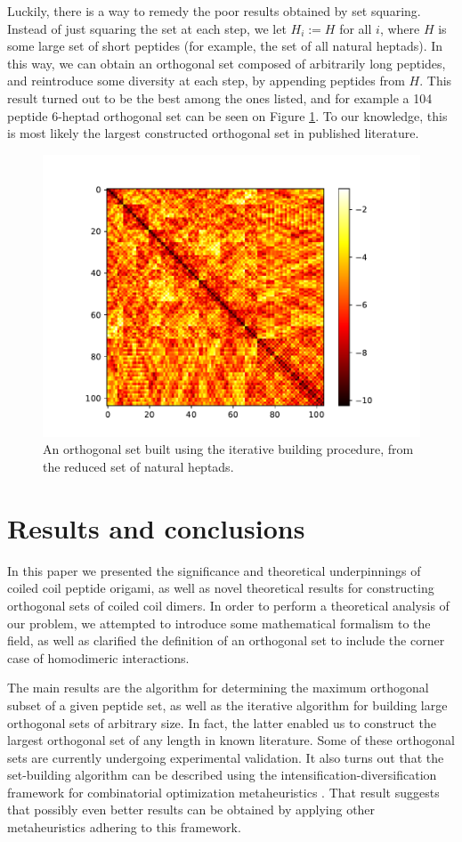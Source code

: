 \documentclass[12pt,a4paper,titlepage,openany]{report}
\begin{document}
Luckily, there is a way to remedy the poor results obtained by set squaring. Instead of just squaring the set at each step, we let $H_i := H$ for all $i$, where $H$ is some large set of short peptides (for example, the set of all natural heptads). In this way, we can obtain an orthogonal set composed of arbitrarily long peptides, and reintroduce some diversity at each step, by appending peptides from $H$. This result turned out to be the best among the ones listed, and for example a 104 peptide 6-heptad orthogonal set can be seen on Figure \ref{fig:interaction matrix-hexaheptad}. To our knowledge, this is most likely the largest constructed orthogonal set in published literature.

\begin{figure}[h]
	\centering
	\includegraphics[width=0.7\linewidth]{interaction_matrix_hexaheptad}
	\caption{An orthogonal set built using the iterative building procedure, from the reduced set of natural heptads.}
	\label{fig:interaction matrix-hexaheptad}
\end{figure}

\chapter{Results and conclusions}
\thispagestyle{fancy}
\label{chap:Results and conclusions}

In this paper we presented the significance and theoretical underpinnings of coiled coil peptide origami, as well as novel theoretical results for constructing orthogonal sets of coiled coil dimers. In order to perform a theoretical analysis of our problem, we attempted to introduce some mathematical formalism to the field, as well as clarified the definition of an orthogonal set to include the corner case of homodimeric interactions. 

The main results are the algorithm for determining the maximum orthogonal subset of a given peptide set, as well as the iterative algorithm for building large orthogonal sets of arbitrary size. In fact, the latter enabled us to construct the largest orthogonal set of any length in known literature. Some of these orthogonal sets are currently undergoing experimental validation. It also turns out that the set-building algorithm can be described using the intensification-diversification framework for combinatorial optimization metaheuristics \cite{blum2003metaheuristics}. That result suggests that possibly even better results can be obtained by applying other metaheuristics adhering to this framework.
\end{document}
